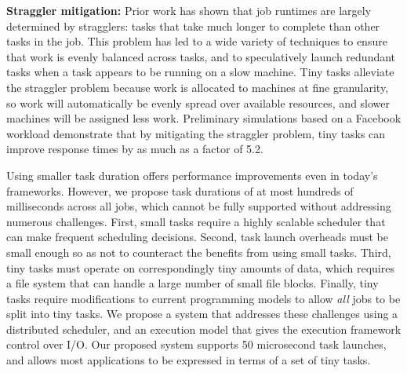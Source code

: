 \vspace{4pt}\noindent\textbf{Straggler mitigation:}
Prior work has shown that job runtimes are largely determined by
stragglers: tasks that take much longer to complete than other tasks in the
job. This problem has led to a wide variety of techniques to ensure that
work is evenly balanced across tasks, and to speculatively launch
redundant tasks when a task appears to be running on a slow machine.
Tiny tasks alleviate the straggler problem because work is allocated to
machines at fine granularity, so work will automatically be evenly spread
over available resources, and slower machines will be assigned
less work. Preliminary simulations based on a Facebook workload
demonstrate that by mitigating the straggler problem, tiny tasks
can improve response times by as much as a factor of 5.2.


Using smaller task duration offers performance improvements even in
today's frameworks.  However, we propose task durations of at most
hundreds of milliseconds across all jobs, which cannot be fully supported without addressing
numerous challenges. First, small tasks require a highly scalable scheduler
that can make frequent scheduling decisions. Second,
task launch overheads must be small enough so as not to counteract the
benefits from using small tasks.
Third, tiny tasks must operate on correspondingly tiny amounts
of data, which requires a file system that can handle a large number of 
small file blocks. Finally, tiny tasks require modifications to current programming
models to allow \emph{all} jobs to be split into tiny tasks. We propose a system
that addresses these challenges using a distributed scheduler, and an execution model that gives the execution framework control
over I/O. Our proposed system supports
50 microsecond task launches, and allows most applications to be
expressed in terms of a set of tiny tasks.

